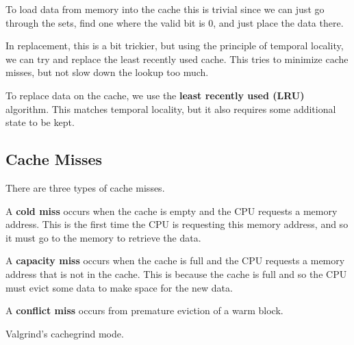   \begin{theorem}[Placement]
    To load data from memory into the cache this is trivial since we can just go through the sets, find one where the valid bit is $0$, and just place the data there.  
  \end{theorem}

  In replacement, this is a bit trickier, but using the principle of temporal locality, we can try and replace the least recently used cache. This tries to minimize cache misses, but not slow down the lookup too much. 

  \begin{theorem}[Replacement]
    To replace data on the cache, we use the \textbf{least recently used (LRU)} algorithm. This matches temporal locality, but it also requires some additional state to be kept. 
  \end{theorem}

\subsection{Cache Misses} 

  There are three types of cache misses. 

  \begin{definition}
    A \textbf{cold miss} occurs when the cache is empty and the CPU requests a memory address. This is the first time the CPU is requesting this memory address, and so it must go to the memory to retrieve the data.
  \end{definition}
  
  \begin{definition}
    A \textbf{capacity miss} occurs when the cache is full and the CPU requests a memory address that is not in the cache. This is because the cache is full and so the CPU must evict some data to make space for the new data.
  \end{definition}

  \begin{definition}
    A \textbf{conflict miss} occurs from premature eviction of a warm block. 
  \end{definition}

  Valgrind's cachegrind mode. 


